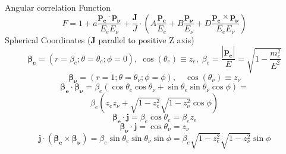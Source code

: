 \documentclass{beamer}
\begin{document}
\begin{frame}{Angular correlation Function}
	$$F = 1 + a \frac{\boldsymbol{p_e}\cdot\boldsymbol{p_\nu}}{E_eE_\nu} + \frac{\boldsymbol{J}}J\cdot\left(A \frac{\boldsymbol{p_e}}{E_e} + B \frac{\boldsymbol{p_\nu}}{E_\nu} + D \frac{\boldsymbol{p_e}\times\boldsymbol{p_\nu}}{E_eE_\nu}\right)$$
	Spherical Coordinates ($\boldsymbol{J}$ parallel to positive Z axis)
	$$\boldsymbol{\beta_e} = (r=\beta_e;\theta=\theta_e;\phi=0),\;\cos(\theta_e) \equiv z_e,\;\beta_e = \frac{|\boldsymbol{p_e}|}{E} = \sqrt{1-\frac{m_e^2}{E^2}}$$
	$$\boldsymbol{\beta_\nu} = (r=1;\theta=\theta_\nu;\phi=\phi),\quad\cos(\theta_\nu) \equiv z_\nu$$
	$$\boldsymbol{\beta_e}\cdot\boldsymbol{\beta_\nu} = \beta_e(\cos\theta_e\cos\theta_\nu + \sin\theta_e\sin\theta_\nu\cos\phi) =$$
	$$ \beta_e(z_ez_\nu + \sqrt{1-z^2_e}\sqrt{1-z^2_\nu}\cos\phi)$$
	$$\boldsymbol{\beta_e}\cdot\boldsymbol{j} = \beta_e\cos\theta_e=\beta_ez_e$$
	$$\boldsymbol{\beta_\nu}\cdot\boldsymbol{j} = \cos\theta_\nu=z_\nu$$
	$$\boldsymbol{j}\cdot(\boldsymbol{\beta_e}\times\boldsymbol{\beta_\nu})=\beta_e\sin\theta_e\sin\theta_\nu\sin\phi=\beta_e\sqrt{1-z^2_e}\sqrt{1-z^2_\nu}\sin\phi$$
\end{frame}	
	
\end{document}
